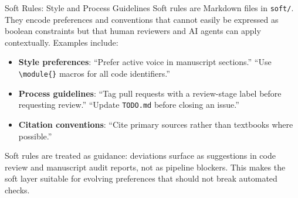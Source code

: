 \documentclass[
  ignorenonframetext,
]{beamer}
\providecommand{\tightlist}{%
  \setlength{\itemsep}{0pt}\setlength{\parskip}{0pt}}
\begin{document}
\begin{frame}{Soft Rules: Style and Process
Guidelines}
\protect{}\label{soft-rules-style-and-process-guidelines}
Soft rules are Markdown files in \texttt{soft/}. They encode preferences
and conventions that cannot easily be expressed as boolean constraints
but that human reviewers and AI agents can apply contextually. Examples
include:

\begin{itemize}
\tightlist
\item
  \textbf{Style preferences}: ``Prefer active voice in manuscript
  sections.'' ``Use \texttt{\textbackslash{}module\{\}} macros for all
  code identifiers.''
\item
  \textbf{Process guidelines}: ``Tag pull requests with a review-stage
  label before requesting review.'' ``Update \texttt{TODO.md} before
  closing an issue.''
\item
  \textbf{Citation conventions}: ``Cite primary sources rather than
  textbooks where possible.''
\end{itemize}

Soft rules are treated as guidance: deviations surface as suggestions in
code review and manuscript audit reports, not as pipeline blockers. This
makes the soft layer suitable for evolving preferences that should not
break automated checks.
\end{frame}
\end{document}

